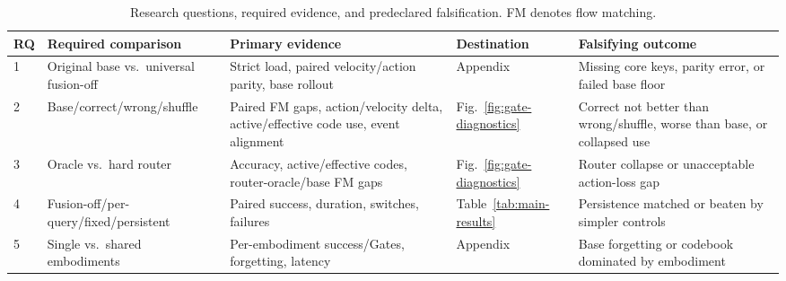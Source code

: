 \begin{table}[t]
\centering
\scriptsize
\setlength{\tabcolsep}{3pt}
\begin{tabular}{p{}p{}p{}p{}p{}}
\toprule
RQ & Required comparison & Primary evidence & Destination & Falsifying outcome \\
\midrule
1 & Original base vs.\ universal fusion-off & Strict load, paired velocity/action parity, base rollout & Appendix & Missing core keys, parity error, or failed base floor \\
2 & Base/correct/wrong/shuffle & Paired FM gaps, action/velocity delta, active/effective code use, event alignment & Fig.~\ref{fig:gate-diagnostics} & Correct not better than wrong/shuffle, worse than base, or collapsed use \\
3 & Oracle vs.\ hard router & Accuracy, active/effective codes, router-oracle/base FM gaps & Fig.~\ref{fig:gate-diagnostics} & Router collapse or unacceptable action-loss gap \\
4 & Fusion-off/per-query/fixed/persistent & Paired success, duration, switches, failures & Table~\ref{tab:main-results} & Persistence matched or beaten by simpler controls \\
5 & Single vs.\ shared embodiments & Per-embodiment success/Gates, forgetting, latency & Appendix & Base forgetting or codebook dominated by embodiment \\
\bottomrule
\end{tabular}
\caption{Research questions, required evidence, and predeclared falsification.
FM denotes flow matching.}
\label{tab:rq-evidence}
\end{table}

